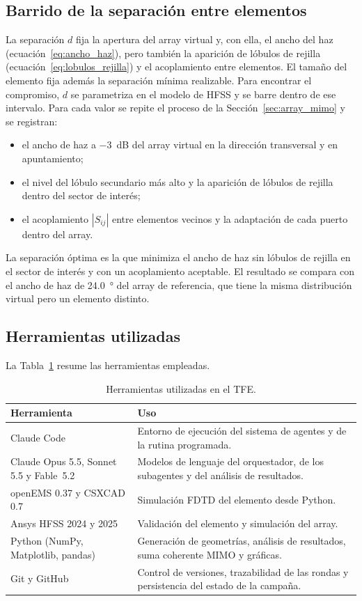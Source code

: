 \documentclass[11pt,a4paper]{article}
\begin{document}
\subsection{Barrido de la separación entre elementos}\label{sec:barrido}
La separación $d$ fija la apertura del array virtual y, con ella, el ancho del haz
(ecuación~\eqref{eq:ancho_haz}), pero también la aparición de lóbulos de rejilla
(ecuación~\eqref{eq:lobulos_rejilla}) y el acoplamiento entre elementos. El tamaño del elemento
fija además la separación mínima realizable. Para encontrar el compromiso, $d$ se parametriza en
el modelo de HFSS y se barre dentro de ese intervalo. Para cada valor se repite el proceso de la
Sección~\ref{sec:array_mimo} y se registran:
\begin{itemize}
    \item el ancho de haz a \SI{-3}{dB} del array virtual en la dirección transversal y en
    apuntamiento;
    \item el nivel del lóbulo secundario más alto y la aparición de lóbulos de rejilla dentro del
    sector de interés;
    \item el acoplamiento $|S_{ij}|$ entre elementos vecinos y la adaptación de cada puerto
    dentro del array.
\end{itemize}
La separación óptima es la que minimiza el ancho de haz sin lóbulos de rejilla en el sector de
interés y con un acoplamiento aceptable. El resultado se compara con el ancho de haz de
\SI{24.0}{\degree} del array de referencia, que tiene la misma distribución
virtual pero un elemento distinto.

\subsection{Herramientas utilizadas}\label{sec:herramientas}
La Tabla~\ref{tab:herramientas} resume las herramientas empleadas.

\begin{table}[H]
    \centering
    \caption{Herramientas utilizadas en el TFE.}
    \label{tab:herramientas}
    \begin{tabularx}{\textwidth}{l X}
        \toprule
        Herramienta & Uso \\
        \midrule
        Claude Code & Entorno de ejecución del sistema de agentes y de la rutina programada. \\
        Claude Opus 5.5, Sonnet 5.5 y Fable~5.2 & Modelos de lenguaje del orquestador, de los
        subagentes y del análisis de resultados. \\
        openEMS 0.37 y CSXCAD 0.7 & Simulación FDTD del elemento desde Python. \\
        Ansys HFSS 2024 y 2025 & Validación del elemento y simulación del array. \\
        Python (NumPy, Matplotlib, pandas) & Generación de geometrías, análisis de resultados,
        suma coherente MIMO y gráficas. \\
        Git y GitHub & Control de versiones, trazabilidad de las rondas y persistencia del estado
        de la campaña. \\
        \bottomrule
    \end{tabularx}
\end{table}
\end{document}
